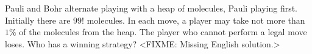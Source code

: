\problem
Pauli and Bohr alternate playing with a heap of molecules, Pauli playing first.
Initially there are $99!$ molecules.
In each move, a player may take not more than $1\%$ of the molecules from the
heap.
The player who cannot perform a legal move loses. Who has a winning strategy?
\solution
<FIXME: Missing English solution.>
\endproblem

